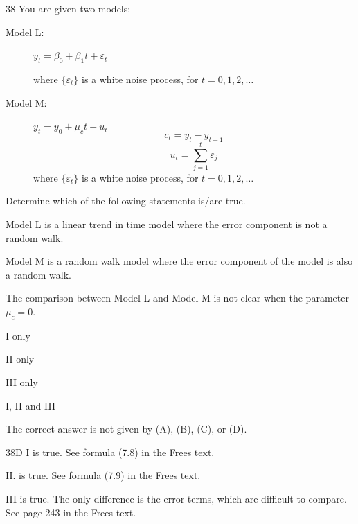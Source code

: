 \begin{question}{38}
You are given two models:
\begin{description}
\item[Model L:] $y_t = \beta_0 + \beta_1 t + \varepsilon_t$

where $\{\varepsilon_t\}$ is a white noise process, for $t = 0,1,2,\ldots$

\item[Model M:] $y_t = y_0 + \mu_c t + u_t$
\[ c_t = y_t - y_{t-1} \]
\[ u_t = \sum_{j=1}^{t} \varepsilon_j \]
where $\{\varepsilon_t\}$ is a white noise process, for $t = 0,1,2,\ldots$
\end{description}

Determine which of the following statements is/are true.
\begin{statements}
\item Model L is a linear trend in time model where the error component is not a random walk.
\item Model M is a random walk model where the error component of the model is also a random walk.
\item The comparison between Model L and Model M is not clear when the parameter $\mu_c = 0$.
\end{statements}

\begin{choices}
\item I only
\item II only
\item III only
\item I, II and III
\item The correct answer is not given by (A), (B), (C), or (D).
\end{choices}
\end{question}
\begin{solution}{38}{D}
I is true. See formula (7.8) in the Frees text.

II. is true. See formula (7.9) in the Frees text.

III is true. The only difference is the error terms, which are difficult to compare. See page 243 in the Frees text.
\end{solution}

